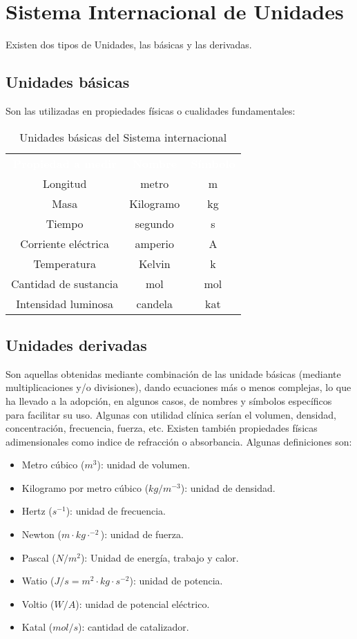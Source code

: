 \section{Sistema Internacional de Unidades}
Existen dos tipos de Unidades, las básicas y las derivadas.
\subsection{Unidades básicas}
Son las utilizadas en propiedades físicas o cualidades fundamentales:
\begin{table}[H]
    \centering
    \begin{tabular}{ccc}
        \rowcolor{black}\textcolor{white}{\textbf{Propiedad a medir}}&\textcolor{white}{\textbf{Nombre}}&\textcolor{white}{\textbf{Símbolo}}\\
        Longitud&metro&m\\
        \rowcolor{hiperlightgray}Masa&Kilogramo&kg\\
        Tiempo&segundo&s\\
        \rowcolor{hiperlightgray}Corriente eléctrica&amperio&A\\
        Temperatura&Kelvin&k\\
        \rowcolor{hiperlightgray}Cantidad de sustancia&mol&mol\\
        Intensidad luminosa&candela&kat\\
        \hline
    \end{tabular}
    \caption{Unidades básicas del Sistema internacional}
\end{table}
\subsection{Unidades derivadas}
Son aquellas obtenidas mediante combinación de las unidade básicas (mediante multiplicaciones y/o divisiones), dando ecuaciones más o menos complejas, lo que ha llevado a la adopción, en algunos casos, de nombres y símbolos específicos para facilitar su uso. Algunas con utilidad clínica serían el volumen, densidad, concentración, frecuencia, fuerza, etc. Existen también propiedades físicas adimensionales como indice de refracción o absorbancia. Algunas definiciones son:
\begin{itemize}[itemsep=0pt,parsep=0pt,topsep=0pt,partopsep=0pt]
    \item Metro cúbico ($m^3$): unidad de volumen.
    \item Kilogramo por metro cúbico ($kg/m^{-3}$): unidad de densidad.
    \item Hertz ($s^{-1}$): unidad de frecuencia.
    \item Newton ($m\cdot kg\cdot^{-2}$): unidad de fuerza.
    \item Pascal ($N / m^2$): Unidad de energía, trabajo y calor.
    \item Watio ($J / s = m^2\cdot kg\cdot s^{-2}$): unidad de potencia.
    \item Voltio ($W / A$): unidad de potencial eléctrico.
    \item Katal ($mol / s$): cantidad de catalizador.
\end{itemize}
